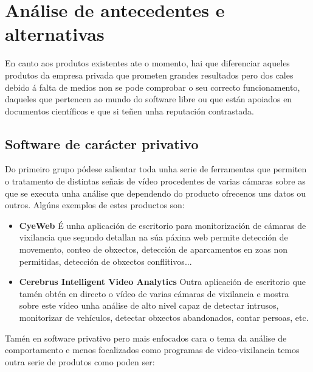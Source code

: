 \chapter{Análise de antecedentes e alternativas}
    En canto aos produtos existentes ate o momento, hai que diferenciar aqueles produtos da empresa
    privada que prometen grandes resultados pero dos cales debido á falta de medios non se pode 
    comprobar o seu correcto funcionamento, daqueles que pertencen ao mundo do software libre ou que
    están apoiados en documentos científicos e que si teñen unha reputación contrastada.
    
    
    \section{Software de carácter privativo}
    
        Do primeiro grupo pódese salientar toda unha serie de ferramentas que permiten o tratamento de 
        distintas señais de vídeo procedentes de varias cámaras sobre as que se executa unha análise que
        dependendo do producto ofrecenos uns datos ou outros. Algúns exemplos de estes productos son:
        
        \begin{itemize}
        \item \textbf{CyeWeb}\cite{CyeWeb}
            É unha aplicación de escritorio para monitorización de cámaras de vixilancia que segundo 
            detallan na súa páxina web permite detección de movemento, conteo de obxectos, detección de
            aparcamentos en zoas non permitidas, detección de obxectos conflitivos...
            
        \item \textbf{Cerebrus Intelligent Video Analytics}\cite{adventura-cerebrus-intelligent-video-analytics}
            Outra aplicación de escritorio que tamén obtén en directo o vídeo de varias cámaras de 
            vixilancia e mostra sobre este vídeo unha análise de alto nivel capaz de detectar intrusos,
            monitorizar de vehículos, detectar obxectos abandonados, contar persoas, etc.
        \end{itemize}
        
        Tamén en software privativo pero mais enfocados cara o tema da análise de comportamento e menos
        focalizados como programas de video-vixilancia temos outra serie de produtos como poden ser:
        
